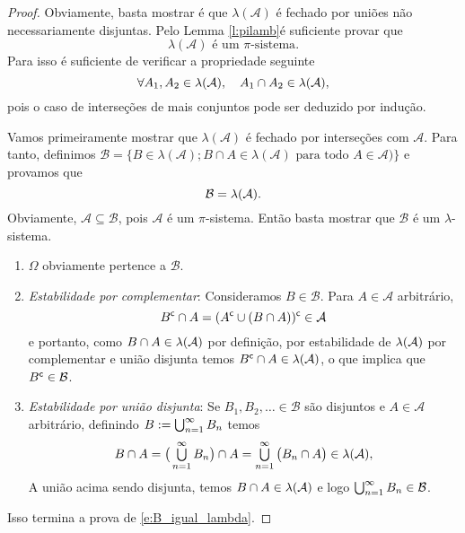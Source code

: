 \documentclass[../main/Notas_de_aula.tex]{subfiles}
\begin{document}
\begin{proof}
  Obviamente, basta mostrar é que $\lambda(\mathcal{A})$ é fechado por uniões não necessariamente disjuntas.
Pelo Lemma \ref{l:pilamb}é suficiente provar que
  \begin{equation}
    \label{e:lambda_is_pi}
    \lambda(\mathcal{A}) \text{ é um $\pi$-sistema}.
  \end{equation}
Para isso é suficiente de verificar a propriedade seguinte
  \begin{equation}\label{interestavel}
   \forall A_1,A_2 \in \lambda({\mathcal A}),\quad  A_1\cap A_2 \in \lambda({\mathcal A}),
  \end{equation}
pois o caso de interseções de mais conjuntos pode ser deduzido por indução.

  \medskip


  Vamos primeiramente mostrar que $\lambda(\mathcal{A})$ é fechado por interseções com $\mathcal{A}$.
  Para tanto, definimos $\mathcal{B} = \big\{B \in \lambda(\mathcal{A}); \text{$B \cap A \in \lambda(\mathcal{A})$ para todo $A \in \mathcal{A}$})\big\}$ e provamos que
  \begin{equation}
    \label{e:B_igual_lambda}
    {\ensuremath{\mathcal B}} = \lambda(\mathcal{A}).
  \end{equation}
  Obviamente, $\mathcal{A} \subseteq \mathcal{B}$, pois $\mathcal{A}$ é um $\pi$-sistema.
  Então basta mostrar que $\mathcal{B}$ é um $\lambda$-sistema.
  \begin{enumerate}[\quad a)]
  \item $\Omega$ obviamente pertence a $\mathcal{B}$.
  \item \textit{Estabilidade por complementar}: Consideramos $B \in \mathcal{B}$. Para  $A \in \mathcal{A}$ arbitrário,
  $$B^{\mathsf{c}} \cap A =(A^{\mathsf{c}} \cup (B \cap A))^{\mathsf{c}}\in {\ensuremath{\mathcal A}} $$
  e portanto, como $B \cap A\in \lambda({\mathcal A})$ por definição, por estabilidade de $\lambda({\mathcal A})$ por complementar e união disjunta temos
  $B^{\mathsf{c}} \cap A \in \lambda({\mathcal A})$, o que implica que $B^{\mathsf{c}}\in {\ensuremath{\mathcal B}}$.
  \item \textit{Estabilidade por união disjunta}: Se $B_1, B_2, \dots \in \mathcal{B}$ são disjuntos e $A \in \mathcal{A}$ arbitrário, definindo $B:=\operatorname*{{\textstyle \bigcup}}_{n=1}^{\infty} B_n$
  temos
    \begin{equation}
   B\cap A=   \big(\operatorname*{{\textstyle \bigcup}}_{n=1}^{\infty} B_n \big) \cap A = \operatorname*{{\textstyle \bigcup}}_{n=1}^{\infty} \big(B_n \cap A\big) \in \lambda(\mathcal{A}),
    \end{equation}
   A união acima sendo disjunta, temos  $B \cap A \in \lambda({\mathcal A})$ e
    logo $\operatorname*{{\textstyle \bigcup}}_{n=1}^{\infty} B_n \in \mathcal{B}$.
  \end{enumerate}
  Isso termina a prova de \eqref{e:B_igual_lambda}.


\end{proof}
\end{document}
